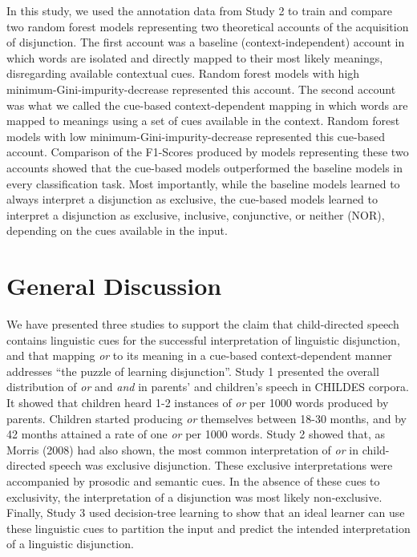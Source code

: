 \documentclass[
  ,man,floatsintext]{apa6}
\begin{document}
In this study, we used the annotation data from Study 2 to train and compare two random forest models representing two theoretical accounts of the acquisition of disjunction. The first account was a baseline (context-independent) account in which words are isolated and directly mapped to their most likely meanings, disregarding available contextual cues. Random forest models with high minimum-Gini-impurity-decrease represented this account. The second account was what we called the cue-based context-dependent mapping in which words are mapped to meanings using a set of cues available in the context. Random forest models with low minimum-Gini-impurity-decrease represented this cue-based account. Comparison of the F1-Scores produced by models representing these two accounts showed that the cue-based models outperformed the baseline models in every classification task. Most importantly, while the baseline models learned to always interpret a disjunction as exclusive, the cue-based models learned to interpret a disjunction as exclusive, inclusive, conjunctive, or neither (NOR), depending on the cues available in the input.

\hypertarget{general-discussion}{%
\section{General Discussion}\label{general-discussion}}

We have presented three studies to support the claim that child-directed speech contains linguistic cues for the successful interpretation of linguistic disjunction, and that mapping \emph{or} to its meaning in a cue-based context-dependent manner addresses ``the puzzle of learning disjunction''. Study 1 presented the overall distribution of \emph{or} and \emph{and} in parents' and children's speech in CHILDES corpora. It showed that children heard 1-2 instances of \emph{or} per 1000 words produced by parents. Children started producing \emph{or} themselves between 18-30 months, and by 42 months attained a rate of one \emph{or} per 1000 words. Study 2 showed that, as Morris (2008) had also shown, the most common interpretation of \emph{or} in child-directed speech was exclusive disjunction. These exclusive interpretations were accompanied by prosodic and semantic cues. In the absence of these cues to exclusivity, the interpretation of a disjunction was most likely non-exclusive. Finally, Study 3 used decision-tree learning to show that an ideal learner can use these linguistic cues to partition the input and predict the intended interpretation of a linguistic disjunction.
\end{document}
